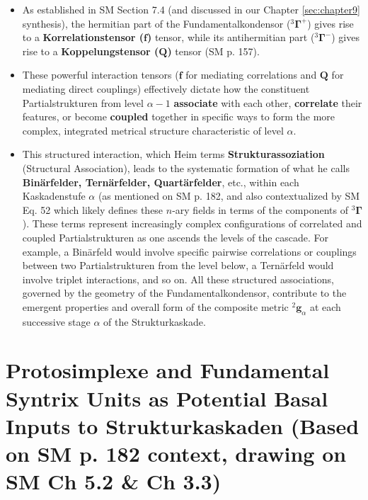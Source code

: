 \documentclass[
    12pt,              %
    a4paper,           %
    headings=normal,   %
    twoside=true,      %
    BCOR=8mm,          %
]{scrbook}
\newcommand{\kompositionsfeld}{{}^2\mathbf{g}}
\newcommand{\fundamentalkondensor}{{}^3\bm{\Gamma}}
\newcommand{\korrelationstensor}{\mathbf{f}}
\newcommand{\koppelungstensor}{\mathbf{Q}}
\newcommand{\kaskadenstufe}{\alpha}
\begin{document}
\begin{itemize}
    \item   As established in SM Section 7.4 (and discussed in our Chapter \ref{sec:chapter9} synthesis), the hermitian part of the Fundamentalkondensor (\(\fundamentalkondensor^+\)) gives rise to a \textbf{Korrelationstensor (\(\korrelationstensor\))} tensor, while its antihermitian part (\(\fundamentalkondensor^-\)) gives rise to a \textbf{Koppelungstensor (\(\koppelungstensor\))} tensor (SM p. 157).
    \item   These powerful interaction tensors (\(\korrelationstensor\) for mediating correlations and \(\koppelungstensor\) for mediating direct couplings) effectively dictate how the constituent Partialstrukturen from level \(\kaskadenstufe-1\) \textbf{associate} with each other, \textbf{correlate} their features, or become \textbf{coupled} together in specific ways to form the more complex, integrated metrical structure characteristic of level \(\kaskadenstufe\).
    \item   This structured interaction, which Heim terms \textbf{Strukturassoziation} (Structural Association), leads to the systematic formation of what he calls \textbf{Binärfelder, Ternärfelder, Quartärfelder}, etc., within each Kaskadenstufe \(\kaskadenstufe\) (as mentioned on SM p. 182, and also contextualized by SM Eq. 52 which likely defines these \(n\)-ary fields in terms of the components of \(\fundamentalkondensor\)). These terms represent increasingly complex configurations of correlated and coupled Partialstrukturen as one ascends the levels of the cascade. For example, a Binärfeld would involve specific pairwise correlations or couplings between two Partialstrukturen from the level below, a Ternärfeld would involve triplet interactions, and so on. All these structured associations, governed by the geometry of the Fundamentalkondensor, contribute to the emergent properties and overall form of the composite metric \(\kompositionsfeld_\alpha\) at each successive stage \(\kaskadenstufe\) of the Strukturkaskade.
\end{itemize}

\section{Protosimplexe and Fundamental Syntrix Units as Potential Basal Inputs to Strukturkaskaden (Based on SM p. 182 context, drawing on SM Ch 5.2 \& Ch 3.3)}
\label{sec:ch9_2_protosimplexe}
\end{document}
